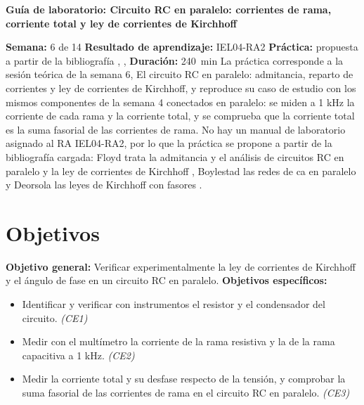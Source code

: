 \documentclass[12pt]{article}
\begin{document}
\nocite{ref1,ref2,ref3}

\datosguia
\lineablanco

{\centering\bfseries Guía de laboratorio: Circuito RC en paralelo: corrientes de rama, corriente total y ley de corrientes de Kirchhoff\par}
\lineablanco
\textbf{Semana:} 6 de 14 \quad \textbf{Resultado de aprendizaje:} IEL04-RA2 \quad \textbf{Práctica:} propuesta a partir de la bibliografía \cite{ref1}, \cite{ref2}, \cite{ref3} \quad \textbf{Duración:} \SI{240}{\minute}
\lineablanco
La práctica corresponde a la sesión teórica de la semana 6, \guillemotleft{}El circuito RC en paralelo: admitancia, reparto de corrientes y ley de corrientes de Kirchhoff\guillemotright{}, y reproduce su caso de estudio con los mismos componentes de la semana 4 conectados en paralelo: se miden a 1 kHz la corriente de cada rama y la corriente total, y se comprueba que la corriente total es la suma fasorial de las corrientes de rama. No hay un manual de laboratorio asignado al RA IEL04-RA2, por lo que la práctica se propone a partir de la bibliografía cargada: Floyd trata la admitancia y el análisis de circuitos RC en paralelo y la ley de corrientes de Kirchhoff \cite{ref1}, Boylestad las redes de ca en paralelo \cite{ref2} y Deorsola las leyes de Kirchhoff con fasores \cite{ref3}.

\section{Objetivos}\label{sec:objetivos}
\textbf{Objetivo general:} Verificar experimentalmente la ley de corrientes de Kirchhoff y el ángulo de fase en un circuito RC en paralelo.
\lineablanco
\textbf{Objetivos específicos:}
\begin{itemize}
  \item Identificar y verificar con instrumentos el resistor y el condensador del circuito. \emph{(CE1)}
  \item Medir con el multímetro la corriente de la rama resistiva y la de la rama capacitiva a 1 kHz. \emph{(CE2)}
  \item Medir la corriente total y su desfase respecto de la tensión, y comprobar la suma fasorial de las corrientes de rama en el circuito RC en paralelo. \emph{(CE3)}
\end{itemize}
\end{document}
